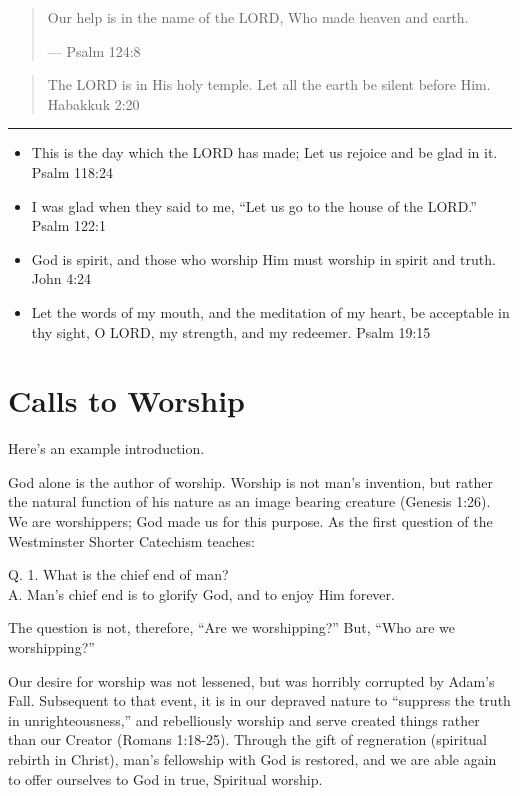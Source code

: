 \documentclass[]{book}
\begin{document}
\begin{quote}
Our help is in the name of the LORD, Who made heaven and earth.

--- Psalm 124:8
\end{quote}

\begin{quote}
The LORD is in His holy temple. Let all the earth be silent before Him. \textbar{} Habakkuk 2:20
\end{quote}

\begin{center}\rule{0.5\linewidth}{\linethickness}\end{center}

\begin{itemize}
\item
  This is the day which the LORD has made; Let us rejoice and be glad in it. \textbar{} Psalm 118:24
\item
  I was glad when they said to me, ``Let us go to the house of the LORD.'' \textbar{} Psalm 122:1
\item
  God is spirit, and those who worship Him must worship in spirit and truth. \textbar{} John 4:24
\item
  Let the words of my mouth, and the meditation of my heart, be acceptable in thy sight, O LORD, my strength, and my redeemer. \textbar{} Psalm 19:15
\end{itemize}

\hypertarget{calls-to-worship}{%
\chapter*{Calls to Worship}\label{calls-to-worship}}

Here's an example introduction.

God alone is the author of worship. Worship is not man's invention, but rather the natural function of his nature as an image bearing creature (Genesis 1:26). We are worshippers; God made us for this purpose. As the first question of the Westminster Shorter Catechism teaches:

Q. 1. What is the chief end of man?\\
A. Man's chief end is to glorify God, and to enjoy Him forever.

The question is not, therefore, ``Are we worshipping?'' But, ``Who are we worshipping?''

Our desire for worship was not lessened, but was horribly corrupted by Adam's Fall. Subsequent to that event, it is in our depraved nature to ``suppress the truth in unrighteousness,'' and rebelliously worship and serve created things rather than our Creator (Romans 1:18-25). Through the gift of regneration (spiritual rebirth in Christ), man's fellowship with God is restored, and we are able again to offer ourselves to God in true, Spiritual worship.
\end{document}
